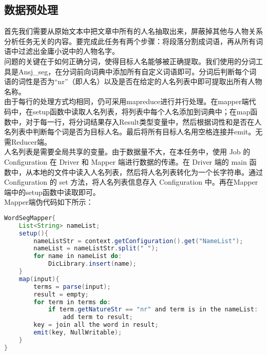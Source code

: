 \subsection{数据预处理}
首先我们需要从原始文本中把文章中所有的人名抽取出来，屏蔽掉其他与人物关系分析任务无关的内容。要完成此任务有两个步骤：将段落分割成词语，再从所有词语中过滤出金庸小说中的人物名字。\\
\indent 问题的关键在于如何正确分词，使得目标人名能够被正确提取。我们使用的分词工具是Ansj\_seg，在分词前向词典中添加所有自定义词语即可。分词后判断每个词语的词性是否为“nr”（即人名）以及是否在给定的人名列表中即可提取出所有人物名称。\\
\indent 由于每行的处理方式均相同，仍可采用mapreduce进行并行处理。在mapper端代码中，在setup函数中读取人名列表，将列表中每个人名添加到词典中；在map函数中，对于每一行，将分词结果存入Result类型变量中，然后根据词性和是否在人名列表中判断每个词是否为目标人名。最后将所有目标人名用空格连接并emit。无需Reducer端。\\
\indent 人名列表是需要全局共享的变量。由于数据量不大，在本任务中，使用 Job 的 Configuration 在 Driver 和 Mapper 端进行数据的传递。在 Driver 端的 main 函数中，从本地的文件中读入人名列表，然后将人名列表转化为一个长字符串。通过 Configuration 的 set 方法，将人名列表信息存入 Configuration 中。再在Mapper端中的setup函数中读取即可。\\
Mapper端伪代码如下所示：
\newpage
\begin{lstlisting}[language=Java]
WordSegMapper{
	List<String> nameList;
	setup(){
		nameListStr = context.getConfiguration().get("NameList");
		nameList = nameListStr.split(" ");
		for name in nameList do:
			DicLibrary.insert(name);
	}
	map(input){
		terms = parse(input);
		result = empty;
		for term in terms do:
			if term.getNatureStr == "nr" and term is in the nameList:
				add term to result;
		key = join all the word in result;
		emit(key, NullWritable);
	}
}
\end{lstlisting}